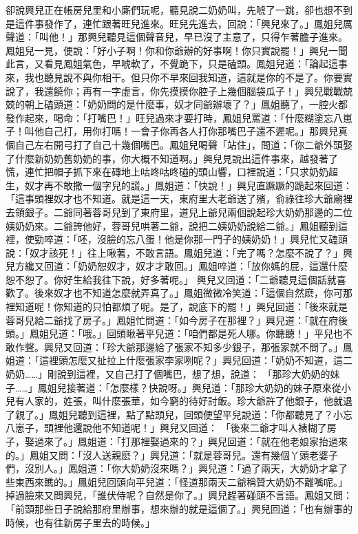 卻說興兒正在帳房兒里和小廝們玩呢，聽見說二奶奶叫，先唬了一跳，卻也想不到是這件事發作了，連忙跟著旺兒進來。旺兒先進去，回說：「興兒來了。」鳳姐兒厲聲道：「叫他！」那興兒聽見這個聲音兒，早已沒了主意了，只得乍著膽子進來。鳳姐兒一見，便說：「好小子啊！你和你爺辦的好事啊！你只實說罷！」興兒一聞此言，又看見鳳姐氣色，早唬軟了，不覺跪下，只是磕頭。鳳姐兒道：「論起這事來，我也聽見說不與你相干。但只你不早來回我知道，這就是你的不是了。你要實說了，我還饒你；再有一字虛言，你先摸摸你腔子上幾個腦袋瓜子！」興兒戰戰兢兢的朝上磕頭道：「奶奶問的是什麼事，奴才同爺辦壞了？」鳳姐聽了，一腔火都發作起來，喝命：「打嘴巴！」旺兒過來才要打時，鳳姐兒罵道：「什麼糊塗忘八崽子！叫他自己打，用你打嗎！一會子你再各人打你那嘴巴子還不遲呢。」那興兒真個自己左右開弓打了自己十幾個嘴巴。鳳姐兒喝聲「站住」，問道：「你二爺外頭娶了什麼新奶奶舊奶奶的事，你大概不知道啊。」興兒見說出這件事來，越發著了慌，連忙把帽子抓下來在磚地上咕咚咕咚碰的頭山響，口裡說道：「只求奶奶超生，奴才再不敢撒一個字兒的謊。」鳳姐道：「快說！」興兒直蹶蹶的跪起來回道：「這事頭裡奴才也不知道。就是這一天，東府里大老爺送了殯，俞祿往珍大爺廟裡去領銀子。二爺同著蓉哥兒到了東府里，道兒上爺兒兩個說起珍大奶奶那邊的二位姨奶奶來。二爺誇他好，蓉哥兒哄著二爺，說把二姨奶奶說給二爺。」鳳姐聽到這裡，使勁啐道：「呸，沒臉的忘八蛋！他是你那一門子的姨奶奶！」興兒忙又磕頭說：「奴才該死！」往上啾著，不敢言語。鳳姐兒道：「完了嗎？怎麼不說了？」興兒方纔又回道：「奶奶恕奴才，奴才才敢回。」鳳姐啐道：「放你媽的屁，這還什麼恕不恕了。你好生給我往下說，好多著呢。」 興兒又回道：「二爺聽見這個話就喜歡了。後來奴才也不知道怎麼就弄真了。」鳳姐微微冷笑道：「這個自然麽，你可那裡知道呢！你知道的只怕都煩了呢。是了，說底下的罷！」興兒回道：「後來就是蓉哥兒給二爺找了房子。」鳳姐忙問道：「如今房子在那裡？」興兒道：「就在府後頭。」鳳姐兒道：「哦。」回頭瞅著平兒道：「咱們都是死人哪。你聽聽！」平兒也不敢作聲。興兒又回道：「珍大爺那邊給了張家不知多少銀子，那張家就不問了。」鳳姐道：「這裡頭怎麼又扯拉上什麼張家李家咧呢？」興兒回道：「奶奶不知道，這二奶奶……」剛說到這裡，又自己打了個嘴巴，想了想，說道： 「那珍大奶奶的妹子……」鳳姐兒接著道：「怎麼樣？快說呀。」興兒道：「那珍大奶奶的妹子原來從小兒有人家的，姓張，叫什麼張華，如今窮的待好討飯。珍大爺許了他銀子，他就退了親了。」鳳姐兒聽到這裡，點了點頭兒，回頭便望平兒說道：「你都聽見了？小忘八崽子，頭裡他還說他不知道呢！」興兒又回道： 「後來二爺才叫人裱糊了房子，娶過來了。」鳳姐道：「打那裡娶過來的？」興兒回道：「就在他老娘家抬過來的。」鳳姐又問：「沒人送親麽？」興兒道：「就是蓉哥兒。還有幾個丫頭老婆子們，沒別人。」鳳姐道：「你大奶奶沒來嗎？」興兒道：「過了兩天，大奶奶才拿了些東西來瞧的。」鳳姐兒回頭向平兒道：「怪道那兩天二爺稱贊大奶奶不離嘴呢。」掉過臉來又問興兒，「誰伏侍呢？自然是你了。」興兒趕著碰頭不言語。鳳姐又問：「前頭那些日子說給那府里辦事，想來辦的就是這個了。」興兒回道：「也有辦事的時候，也有往新房子里去的時候。」

